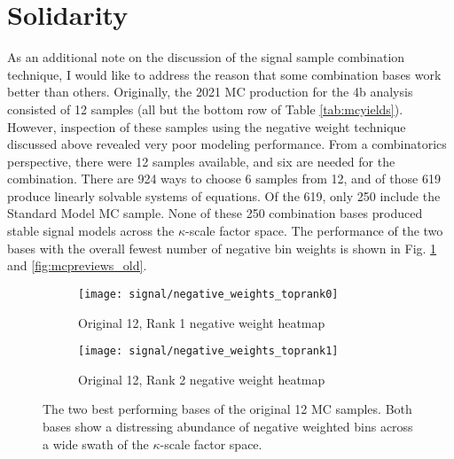 \section{Solidarity} \label{sec:solidarity}
    
    As an additional note on the discussion of the signal sample combination technique,
        I would like to address the reason that some combination bases work better than others.
    Originally, the 2021 MC production for the 4b analysis consisted of 12 samples (all but the bottom row of Table \ref{tab:mcyields}).
    However, inspection of these samples using the negative weight technique discussed above revealed very poor modeling performance.
    From a combinatorics perspective, there were 12 samples available, and six are needed for the combination.
    There are 924 ways to choose 6 samples from 12, and of those 619 produce linearly solvable systems of equations.
    Of the 619, only 250 include the Standard Model MC sample.
    None of these 250 combination bases produced stable signal models across the $\kappa$-scale factor space.
    The performance of the two bases with the overall fewest number of negative bin weights is shown in Fig. \ref{fig:mcnWeight_old} and \ref{fig:mcpreviews_old}.

    \begin{figure}[tbh]
    	\centering
        \begin{subfigure}{0.44\textwidth}
            \texttt{[image: signal/negative\_weights\_toprank0]}
            \captionsetup{justification=centering} \caption{Original 12, Rank 1 negative weight heatmap}
        \end{subfigure}
        \begin{subfigure}{0.44\textwidth}
            \texttt{[image: signal/negative\_weights\_toprank1]}
            \captionsetup{justification=centering} \caption{Original 12, Rank 2 negative weight heatmap}
        \end{subfigure}
        \caption{
            The two best performing bases of the original 12 MC samples.
            Both bases show a distressing abundance of negative weighted bins across a wide swath of the $\kappa$-scale factor space.
        }
        \label{fig:mcnWeight_old}
    \end{figure}


